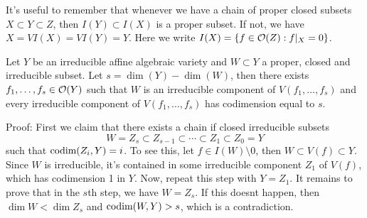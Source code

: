 \begin{remark}
    It's useful to remember that whenever we have a chain of proper closed subsets $X\subset Y\subset Z$, then 
    $I(Y)\subset I(X)$ is a proper subset. If not, we have $X=VI(X)=VI(Y)=Y$. 
    Here we write $I(X)=\{f\in\mathcal{O}(Z): f|_X=0\}$.
\end{remark}


\begin{dang}
    \begin{lemma}\label{lemma: teor. do ideal principal generalizado}
        Let $Y$ be an irreducible affine algebraic variety and 
        $W\subset Y$ a proper, closed and irreducible subset. Let $s=\dim(Y)-\dim(W)$, then there exists 
        $f_1,\dots, f_s\in\mathcal{O}(Y)$ such that $W$ is an irreducible component of 
        $V(f_1,\dots, f_s)$ and every irreducible component of $V(f_1,\dots, f_s)$
        has codimension equal to $s$.
    \end{lemma}
\end{dang}
Proof: First we claim that there exists a chain if closed irreducible subsets 
\begin{equation}
    W = Z_s\subset Z_{s-1}\subset\cdots\subset Z_1\subset Z_0 = Y 
\end{equation}
such that $\text{codim}(Z_i, Y)=i$. To see this, let $f\in I(W)\setminus0$, then 
$W\subset V(f)\subset Y$. Since $W$ is irreducible, it's contained in some irreducible component $Z_1$ 
of $V(f)$, which has codimension 1 in $Y$. Now, repeat this step with $Y=Z_1$. It remains to prove that 
in the $s$th step, we have $W=Z_s$. If this doesnt happen, then $\dim W < \dim Z_s$ and $\text{codim}(W,Y)>s$, which is 
a contradiction.\par 

